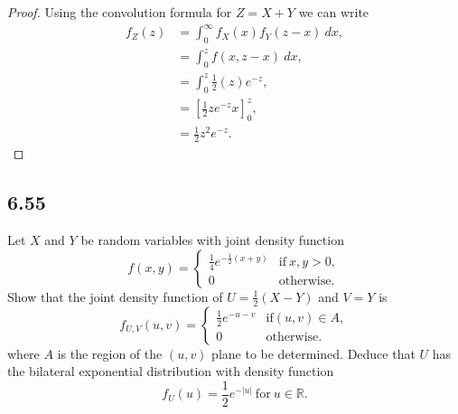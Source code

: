 \documentclass{article}
\newcommand{\R}{\mathbb{R}}
\begin{document}
\begin{proof}
    Using the convolution formula for $Z = X+Y$ we can write
    \begin{align*}
        f_Z(z) & = \int_0^\infty f_X(x)f_Y(z - x) \ dx,  \\
               & = \int_0^z f(x, z - x) \ dx,            \\
               & = \int_0^z \frac{1}{2}(z)e^{-z},        \\
               & = \left[\frac{1}{2}ze^{-z}x\right]_0^z, \\
               & = \frac{1}{2}z^2e^{-z}.
    \end{align*}
\end{proof}

\subsection*{6.55}
Let $X$ and $Y$ be random variables with joint density function
\begin{equation*}
    f(x,y) = \begin{cases}
        \frac{1}{4}e^{-\frac{1}{2}(x+y)} & \text{if} \ x,y>0, \\
        0                                & \text{otherwise.}
    \end{cases}
\end{equation*}
Show that the joint density function of $U=\frac{1}{2}(X-Y)$ and
$V=Y$ is
\begin{equation*}
    f_{U,V}(u,v) = \begin{cases}
        \frac{1}{2}e^{-u-v} & \text{if} (u,v) \in A, \\
        0                   & \text{otherwise}.
    \end{cases}
\end{equation*}
where $A$ is the region of the $(u,v)$ plane to be determined. Deduce that $U$ has the
bilateral exponential distribution with density function
\[f_U(u) = \frac{1}{2}e^{-|u|} \ \text{for} \ u \in \R.\]
\end{document}
